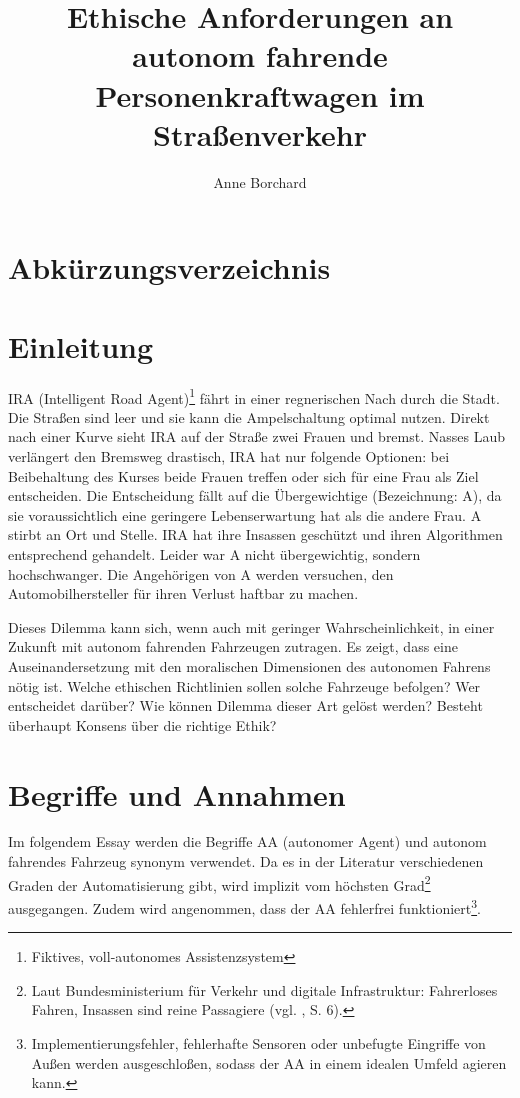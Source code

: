 \documentclass[a4paper, 12pt, titlepage]{scrartcl}
\begin{document}
\author{Anne Borchard}
\title{Ethische Anforderungen an autonom fahrende Personenkraftwagen im Stra\ss enverkehr}
\publishers{Humboldt-Universit\"at zu Berlin}
\maketitle
\tableofcontents
\newpage

\section*{Abk\"urzungsverzeichnis}
\begin{acronym}
\end{acronym}
\newpage

\section{Einleitung}
	IRA (Intelligent Road Agent)\footnote{Fiktives, voll-autonomes Assistenzsystem} fährt in einer regnerischen Nach durch die Stadt. Die Straßen sind leer und sie kann die Ampelschaltung optimal nutzen. Direkt nach einer Kurve sieht IRA auf der Straße zwei Frauen und bremst. Nasses Laub verl\"angert den Bremsweg drastisch, IRA hat nur folgende Optionen: bei Beibehaltung des Kurses beide Frauen treffen oder sich f\"ur eine Frau als Ziel entscheiden. Die Entscheidung fällt auf die \"Ubergewichtige (Bezeichnung: A), da sie voraussichtlich eine geringere Lebenserwartung hat als die andere Frau. A stirbt an Ort und Stelle. IRA hat ihre Insassen geschützt und ihren Algorithmen entsprechend gehandelt. Leider war A nicht übergewichtig, sondern hochschwanger. Die Angehörigen von A werden versuchen, den Automobilhersteller für ihren Verlust haftbar zu machen.
	
	Dieses Dilemma kann sich, wenn auch mit geringer Wahrscheinlichkeit, in einer Zukunft mit autonom fahrenden Fahrzeugen zutragen. Es zeigt, dass eine Auseinandersetzung mit den moralischen Dimensionen des autonomen Fahrens n\"otig ist. Welche ethischen Richtlinien sollen solche Fahrzeuge befolgen? Wer entscheidet dar\"uber? Wie k\"onnen Dilemma dieser Art gel\"ost werden? Besteht \"uberhaupt Konsens \"uber die \glqq richtige\grqq{} Ethik?
\section{Begriffe und Annahmen}
	Im folgendem Essay werden die Begriffe AA (autonomer Agent) und autonom fahrendes Fahrzeug synonym verwendet. Da es in der Literatur verschiedenen Graden der Automatisierung gibt, wird implizit vom h\"ochsten Grad\footnote{Laut Bundesministerium für Verkehr und digitale Infrastruktur: Fahrerloses Fahren, Insassen sind reine Passagiere (vgl. \autocite{bmvi2015}, S. 6).} ausgegangen. Zudem wird angenommen, dass der AA fehlerfrei funktioniert\footnote{Implementierungsfehler, fehlerhafte Sensoren oder unbefugte Eingriffe von Au\ss en werden ausgeschlo\ss en, sodass der AA in einem idealen Umfeld agieren kann.}.
	
\end{document}
